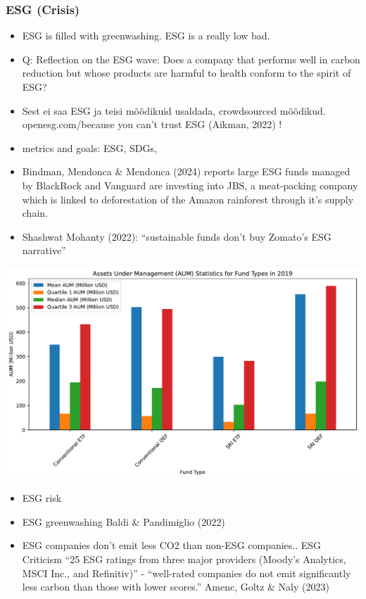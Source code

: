 \documentclass[
  letterpaper,
  DIV=11,
  numbers=noendperiod]{scrartcl}
\begin{document}
\subsubsection{ESG (Crisis)}\label{esg-crisis}

\begin{itemize}
\item
  ESG is filled with greenwashing. ESG is a really low bad.
\item
  Q: Reflection on the ESG wave: Does a company that performs well in
  carbon reduction but whose products are harmful to health conform to
  the spirit of ESG?
\item
  Sest ei saa ESG ja teisi mõõdikuid usaldada, crowdsourced mõõdikud.
  openesg.com/because you can't trust ESG (Aikman, 2022) !
\end{itemize}

\begin{itemize}
\item
  metrics and goals: ESG, SDGs,
\item
  Bindman, Mendonca \& Mendonca (2024) reports large ESG funds managed
  by BlackRock and Vanguard are investing into JBS, a meat-packing
  company which is linked to deforestation of the Amazon rainforest
  through it's supply chain.
\item
  Shashwat Mohanty (2022): ``sustainable funds don't buy Zomato's ESG
  narrative''
\end{itemize}

\includegraphics{_thesis_files/figure-pdf/cell-59-output-1.pdf}

\begin{itemize}
\item
  ESG risk
\item
  ESG greenwashing Baldi \& Pandimiglio (2022)
\item
  ESG companies don't emit less CO2 than non-ESG companies.. ESG
  Criticism ``25 ESG ratings from three major providers (Moody's
  Analytics, MSCI Inc., and Refinitiv)'' - ``well-rated companies do not
  emit significantly less carbon than those with lower scores.'' Amenc,
  Goltz \& Naly (2023)
\end{itemize}
\end{document}
